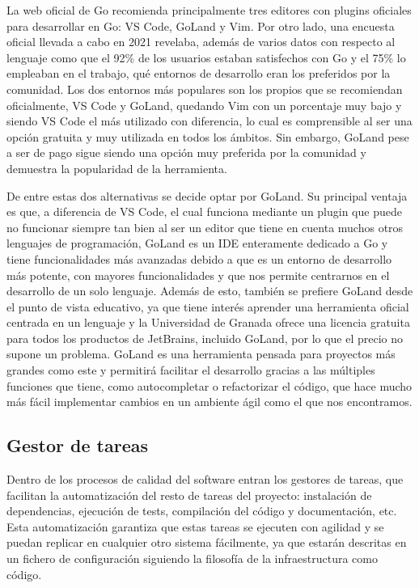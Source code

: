 La web oficial de Go recomienda principalmente tres editores con plugins
oficiales para desarrollar en Go: VS Code, GoLand y Vim. Por otro lado, una
encuesta oficial llevada a cabo en 2021 \cite{go_survey} revelaba, además de
varios datos con respecto al lenguaje como que el 92\% de los usuarios estaban
satisfechos con Go y el 75\% lo empleaban en el trabajo, qué entornos de
desarrollo eran los preferidos por la comunidad. Los dos entornos más populares
son los propios que se recomiendan oficialmente, VS Code y GoLand, quedando Vim
con un porcentaje muy bajo y siendo VS Code el más utilizado con diferencia, lo
cual es comprensible al ser una opción gratuita y muy utilizada en todos los
ámbitos. Sin embargo, GoLand pese a ser de pago sigue siendo una opción muy
preferida por la comunidad y demuestra la popularidad de la herramienta.

De entre estas dos alternativas se decide optar por GoLand. Su principal ventaja
es que, a diferencia de VS Code, el cual funciona mediante un plugin que puede
no funcionar siempre tan bien al ser un editor que tiene en cuenta muchos otros
lenguajes de programación, GoLand es un IDE enteramente dedicado a Go y tiene
funcionalidades más avanzadas debido a que es un entorno de desarrollo más
potente, con mayores funcionalidades y que nos permite centrarnos en el
desarrollo de un solo lenguaje. Además de esto, también se prefiere GoLand desde
el punto de vista educativo, ya que tiene interés aprender una herramienta
oficial centrada en un lenguaje y la Universidad de Granada ofrece una licencia
gratuita para todos los productos de JetBrains, incluido GoLand, por lo que el
precio no supone un problema. GoLand es una herramienta pensada para proyectos
más grandes como este y permitirá facilitar el desarrollo gracias a las
múltiples funciones que tiene, como autocompletar o refactorizar el código, que
hace mucho más fácil implementar cambios en un ambiente ágil como el que nos
encontramos.

\subsection{Gestor de tareas}
Dentro de los procesos de calidad del software entran los gestores de tareas,
que facilitan la automatización del resto de tareas del proyecto: instalación de
dependencias, ejecución de tests, compilación del código y documentación, etc.
Esta automatización garantiza que estas tareas se ejecuten con agilidad y se
puedan replicar en cualquier otro sistema fácilmente, ya que estarán descritas
en un fichero de configuración siguiendo la filosofía de la infraestructura como
código.

